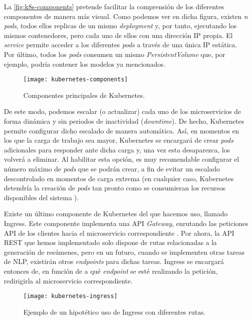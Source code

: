 La \autoref{fig:k8s-components} pretende facilitar la comprensión de los diferentes componentes de manera más visual. Como podemos ver en dicha figura, existen \emph{n} \emph{pods}, todos ellos replicas de un mismo \emph{deployment} y, por tanto, ejecutando los mismos contenedores, pero cada uno de ellos con una dirección IP propia. El \emph{service} permite acceder a los diferentes \emph{pods} a través de una única IP estática. Por último, todos los \emph{pods} consumen un mismo \emph{PersistentVolume} que, por ejemplo, podría contener los modelos ya mencionados.

\begin{figure}[!h]
	\centering
	\texttt{[image: kubernetes-components]}
	\caption{Componentes principales de Kubernetes.}
	\label{fig:k8s-components}
\end{figure}

De este modo, podemos escalar (o actualizar) cada uno de los microservicios de forma dinámica y sin periodos de inactividad (\emph{downtime}). De hecho, Kubernetes permite configurar dicho escalado de manera automática. Así, en momentos en los que la carga de trabajo sea mayor, Kubernetes se encargará de crear \emph{pods} adicionales para responder ante dicha carga y, una vez esta desaparezca, los volverá a eliminar. Al habilitar esta opción, es muy recomendable configurar el número máximo de \emph{pods} que se podrán crear, a fin de evitar un escalado descontrolado en momentos de carga extrema (en cualquier caso, Kubernetes detendría la creación de \emph{pods} tan pronto como se consumieran los recursos disponibles del sistema \cite{k8s-scheduling}).

Existe un último componente de Kubernetes del que hacemos uso, llamado Ingress. Este componente implementa una API \emph{Gateway}, enrutando las peticiones API de los clientes hacia el microservicio correspondiente \cite{api-gateway}. Por ahora, la API REST que hemos implementado solo dispone de rutas relacionadas a la generación de resúmenes, pero en un futuro, cuando se implementen otras tareas de NLP, existirán otros \emph{endpoints} para dichas tareas. Ingress se encargará entonces de, en función de a qué \emph{endpoint} se esté realizando la petición, redirigirla al microservicio correspondiente.

\begin{figure}[!h]
	\centering
	\texttt{[image: kubernetes-ingress]}
	\caption{Ejemplo de un hipotético uso de Ingress con diferentes rutas.}
	\label{fig:k8s-ingress}
\end{figure}


